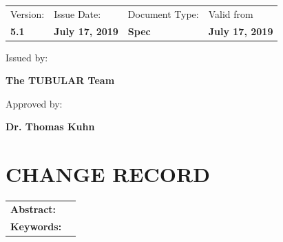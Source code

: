 \documentclass[a4paper,12pt,oneside]{article}
\begin{document}
\begin{flushleft}
\begin{tabular}{p{} p{} p{} p{}}
\footnotesize{Version:}     & \footnotesize{Issue Date:} & \footnotesize{Document Type:} & \footnotesize{Valid from} \\
\textbf{5.1}          & \textbf{July 17, 2019}    & \textbf{Spec}   & \textbf{July 17, 2019}  
\end{tabular}

\vspace{10pt}

\small
{
Issued by:\\
}

\vspace{0.3cm}

\large
{
\textbf{The TUBULAR Team} \\
}

\vspace{0.3cm}

\small
{
Approved by:\\
}

\vspace{0.3cm}

\large
{
\textbf{Dr. Thomas Kuhn}
}
\end{flushleft}




\pagestyle{firstp}
\section*{\small{\textbf{CHANGE RECORD}}}
%


\newpage

\vspace{1cm}
\begin{tabular}{p{} p{}}
\textbf{Abstract:}     &  \\ %
\textbf{Keywords:}     & %

\end{tabular}

\vfill

\newpage
\tableofcontents

\newpage


\newpage

\end{document}
